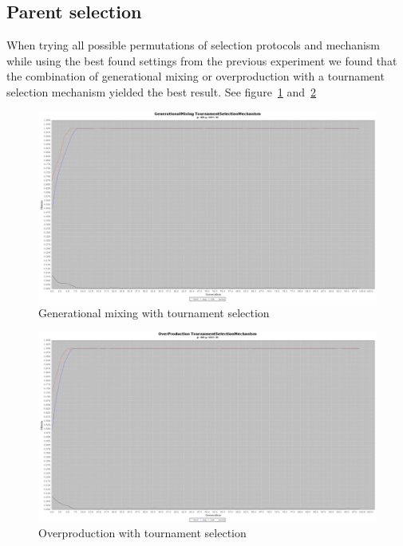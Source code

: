 \subsection{Parent selection}
	When trying all possible permutations of selection protocols and mechanism while using the best found settings from the previous experiment we found that the combination of generational mixing or overproduction with a tournament selection mechanism yielded the best result. See figure~\ref{fig:gen} and~\ref{fig:over}
	\begin{figure}[H]%
	\includegraphics[width=\columnwidth]{1/d/gen.png}%
	\caption{Generational mixing with tournament selection}%
	\label{fig:gen}%
	\end{figure}
	\begin{figure}[H]%
	\includegraphics[width=\columnwidth]{1/d/over.png}%
	\caption{Overproduction with tournament selection}%
	\label{fig:over}%
	\end{figure}
